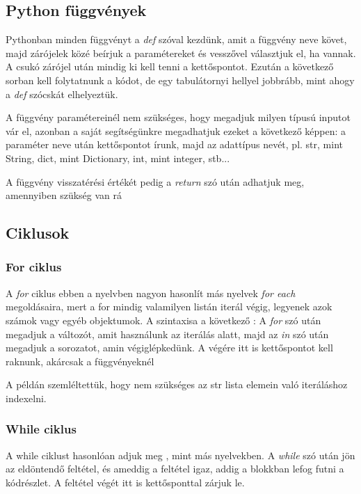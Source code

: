 \documentclass{article}
\theoremstyle{definition}
\theoremstyle{theorem}
\begin{document}
\subsection{Python függvények}
Pythonban minden függvényt a \textit{def} szóval kezdünk, amit a függvény neve követ, majd zárójelek közé beírjuk a paramétereket és vesszővel választjuk el, ha vannak. A csukó zárójel után mindig ki kell tenni a kettőspontot. Ezután a következő sorban kell folytatnunk a kódot, de egy tabulátornyi hellyel jobbrább, mint ahogy a \textit{def} szócskát elhelyeztük.

A függvény paramétereinél nem szükséges, hogy megadjuk milyen típusú inputot vár el, azonban a saját segítségünkre megadhatjuk ezeket a következő képpen: a paraméter neve után kettőspontot írunk, majd az adattípus nevét, pl. str, mint String, dict, mint Dictionary, int, mint integer, stb...


A függvény visszatérési értékét pedig a \textit{return} szó után adhatjuk meg, amennyiben szükség van rá
\subsection{Ciklusok}
\subsubsection{For ciklus}
A \textit{for} ciklus ebben a nyelvben nagyon hasonlít más nyelvek \textit{for each} megoldásaira, mert a for mindig valamilyen listán iterál végig, legyenek azok számok vagy egyéb objektumok. A szintaxisa a következő :
A \textit{for} szó után megadjuk a változót, amit használunk az iterálás alatt, majd az \textit{in} szó után megadjuk a sorozatot, amin végiglépkedünk. A végére itt is kettőspontot kell raknunk, akárcsak a függvényeknél



A példán szemléltettük, hogy nem szükséges az str lista elemein való iteráláshoz indexelni.
\subsubsection{While ciklus}
A while ciklust hasonlóan adjuk meg , mint más nyelvekben. A \textit{while} szó után jön az eldöntendő feltétel, és ameddig a feltétel igaz, addig a blokkban lefog futni a kódrészlet. A feltétel végét itt is kettősponttal zárjuk le.

\end{document}
